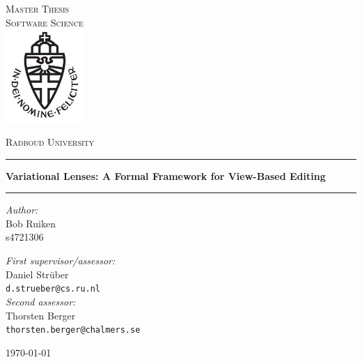 \documentclass[11pt,a4paper]{report}
\theoremstyle{definition}
\begin{document}
\begin{titlepage}
\begin{center}
\textsc{\LARGE Master Thesis\\Software Science}\\[1.5cm]
\includegraphics[height=100pt]{logo}

\vspace{0.4cm}
\textsc{\Large Radboud University}\\[1cm]
\hrule
\vspace{0.4cm}
\textbf{\Large Variational Lenses: A Formal Framework for View-Based Editing}\\[0.4cm]
\hrule
\vspace{2cm}
\begin{minipage}[t]{0.45\textwidth}
\begin{flushleft} \large
\textit{Author:}\\
Bob Ruiken\\
s4721306
\end{flushleft}
\end{minipage}
\begin{minipage}[t]{0.48\textwidth}
\begin{flushright} \large
\textit{First supervisor/assessor:}\\
Daniel Str{\"u}ber\\
\texttt{d.strueber@cs.ru.nl}\\[1.3cm]
\textit{Second assessor:}\\
Thorsten Berger\\
\texttt{thorsten.berger@chalmers.se}
\end{flushright}
\end{minipage}
\vfill
{\large \today}
\end{center}
\end{titlepage}





\setcounter{tocdepth}{1}
\tableofcontents

\setlength{\parskip}{10pt}











\end{document}
